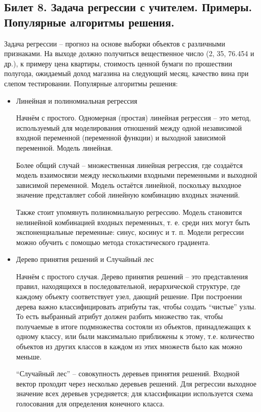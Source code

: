 \documentclass[a4paper, 12pt]{article}
\begin{document}
	\subsection*{Билет 8. Задача регрессии с учителем. Примеры. Популярные алгоритмы решения.}
	Задача регрессии – прогноз на основе выборки объектов с различными признаками. На выходе должно получиться вещественное число (2, 35, 76.454 и др.), к примеру цена квартиры, стоимость ценной бумаги по прошествии полугода, ожидаемый доход магазина на следующий месяц, качество вина при слепом тестировании. Популярные алгоритмы решения:
	\begin{itemize}
	\item Линейная и полиномиальная регрессия
	
	Начнём с простого. Одномерная (простая) линейная регрессия – это метод, используемый для моделирования отношений между одной независимой входной переменной (переменной функции) и выходной зависимой переменной. Модель линейная.
	
	Более общий случай – множественная линейная регрессия, где создаётся модель взаимосвязи между несколькими входными переменными и выходной зависимой переменной. Модель остаётся линейной, поскольку выходное значение представляет собой линейную комбинацию входных значений.
	
	Также стоит упомянуть полиномиальную регрессию. Модель становится нелинейной комбинацией входных переменных, т. е. среди них могут быть экспоненциальные переменные: синус, косинус и т. п. Модели регрессии можно обучить с помощью метода стохастического градиента.
	
	\item Дерево принятия решений и Случайный лес
	
	Начнём с простого случая. Дерево принятия решений – это представления правил, находящихся в последовательной, иерархической структуре, где каждому объекту соответствует узел, дающий решение. При построении дерева важно классифицировать атрибуты так, чтобы создать “чистые” узлы. То есть выбранный атрибут должен разбить множество так, чтобы получаемые в итоге подмножества состояли из объектов, принадлежащих к одному классу, или были максимально приближены к этому, т.е. количество объектов из других классов в каждом из этих множеств было как можно меньше.
	
	“Случайный лес” – совокупность деревьев принятия решений. Входной вектор проходит через несколько деревьев решений. Для регрессии выходное значение всех деревьев усредняется; для классификации используется схема голосования для определения конечного класса.
	

\end{itemize}
\end{document}
